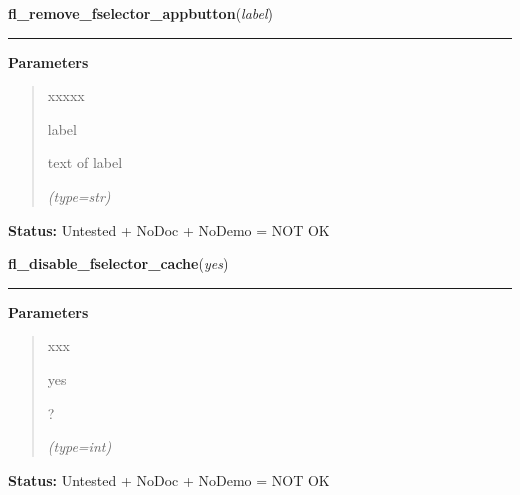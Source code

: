 \hspace{.8\funcindent}\begin{boxedminipage}{\funcwidth}

    \raggedright \textbf{fl\_remove\_fselector\_appbutton}(\textit{label})

    \vspace{-1.5ex}

    \rule{\textwidth}{0.5\fboxrule}
\setlength{\parskip}{2ex}
\setlength{\parskip}{1ex}
      \textbf{Parameters}
      \vspace{-1ex}

      \begin{quote}
        \begin{Ventry}{xxxxx}

          \item[label]

          text of label

            {\it (type=str)}

        \end{Ventry}

      \end{quote}

\textbf{Status:} Untested + NoDoc + NoDemo = NOT OK



    \end{boxedminipage}

    \label{xformslib:flgoodies:fl_disable_fselector_cache}

    \vspace{0.5ex}

\hspace{.8\funcindent}\begin{boxedminipage}{\funcwidth}

    \raggedright \textbf{fl\_disable\_fselector\_cache}(\textit{yes})

    \vspace{-1.5ex}

    \rule{\textwidth}{0.5\fboxrule}
\setlength{\parskip}{2ex}
\setlength{\parskip}{1ex}
      \textbf{Parameters}
      \vspace{-1ex}

      \begin{quote}
        \begin{Ventry}{xxx}

          \item[yes]

          ?

            {\it (type=int)}

        \end{Ventry}

      \end{quote}

\textbf{Status:} Untested + NoDoc + NoDemo = NOT OK



    \end{boxedminipage}


